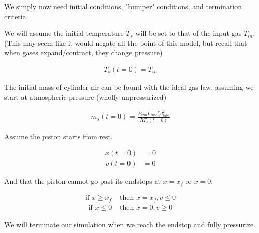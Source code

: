 \documentclass[10pt,letterpaper]{article}
\begin{document}
	We simply now need initial conditions, "bumper" conditions, and termination criteria.
	
	We will assume the initial temperature $T_s$ will be set to that of the input gas $T_{in}$. (This may seem like it would negate all the point of this model, but recall that when gases expand/contract, they change pressure)
	
	\begin{align} \label{eq:ic_T}
		T_s(t=0) = T_{in}
	\end{align}
	
	The initial mass of cylinder air can be found with the ideal gas law, assuming we start at atmospheric pressure (wholly unpressurized)
	
	\begin{align} \label{eq:ic_m}
		m_s(t=0) = \frac{P_{atm} L_{tube} \frac{\pi}{4} d_{tube}^2}{R T_s(t=0)}
	\end{align}
	
	
	
	Assume the piston starts from rest.
	
	\begin{align} \label{eq:ic_x}
		x(t=0) &= 0
	\end{align}\begin{align}\label{eq:ic_v}
		v(t=0) &= 0
	\end{align}
	
	And that the piston cannot go past its endstops at $x=x_f$ or $x=0$.
	
	\begin{align} \label{eq:bump_end}
		\mbox{if } x \geq x_f &\mbox{ then } x = x_f, v \leq 0
	\end{align}\begin{align}\label{eq:bump_start}
		\mbox{if } x \leq 0   &\mbox{ then } x = 0, v \geq 0  
	\end{align}
		
	We will terminate our simulation when we reach the endstop and fully pressurize.
	
\end{document}
